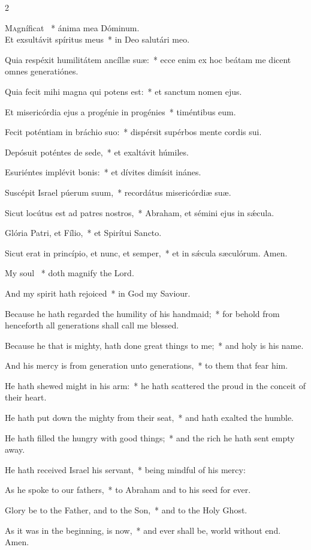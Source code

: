 \documentclass[12pt]{book}
\begin{document}
\begin{paracol}{2}

\lettrine{M}agníficat \cc~* ánima mea Dóminum.\\ Et exsultávit spíritus meus~* in Deo salutári meo.

 Quia respéxit humilitátem ancíllæ suæ:~* ecce enim ex hoc beátam me dicent o\-mnes generatiónes.

 Quia fecit mihi magna qui potens est:~* et san\-ctum nomen ejus.

 Et misericórdia ejus a progénie in progénies~* timéntibus eum.

 Fecit poténtiam in bráchio suo:~* dispérsit supérbos mente cordis sui.

 Depósuit poténtes de sede,~* et exaltávit húmiles.

 Esuriéntes implévit bonis:~* et dívites dimísit inánes.

 Suscépit Israel púerum suum,~* recordátus misericórdiæ suæ.

 Sicut locútus est ad patres no\-stros,~* Abraham, et sémini ejus in sǽcula.

 Glória Patri, et Fílio,~* et Spirítui San\-cto.

 Sicut erat in princípio, et nunc, et semper,~* et in sǽcula sæculórum. Amen.
 
 \switchcolumn
 \begin{enpars}
My soul \cc~* doth magnify the Lord.

And my spirit hath rejoiced~* in God my Saviour.

Because he hath regarded the humility of his handmaid;~* for behold from henceforth all generations shall call me blessed.

Because he that is mighty, hath done great things to me;~* and holy is his name.

And his mercy is from generation unto generations,~* to them that fear him.

He hath shewed might in his arm:~* he hath scattered the proud in the conceit of their heart.

He hath put down the mighty from their seat,~* and hath exalted the humble.

He hath filled the hungry with good things;~* and the rich he hath sent empty away.

He hath received Israel his servant,~* being mindful of his mercy:

As he spoke to our fathers,~* to Abraham and to his seed for ever.

Glory be to the Father, and to the Son,~* and to the Holy Ghost.

As it was in the beginning, is now,~* and ever shall be, world without end. Amen.
\end{enpars}
 \end{paracol}
\end{document}
